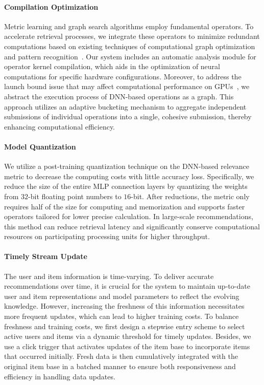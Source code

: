 \paragraph{Compilation Optimization}
Metric learning and graph search algorithms employ fundamental operators.
To accelerate retrieval processes, we integrate these operators to minimize redundant computations based on existing techniques of computational graph optimization and pattern recognition~\cite{niu2021dnnfusion}.
Our system includes an automatic analysis module for operator kernel compilation, which aids in the optimization of neural computations for specific hardware configurations.
Moreover, to address the launch bound issue that may affect computational performance on GPUs~\cite{wang2014characterization}, we abstract the execution process of DNN-based operations as a graph. This approach utilizes an adaptive bucketing mechanism to aggregate independent submissions of individual operations into a single, cohesive submission, thereby enhancing computational efficiency.

\paragraph{Model Quantization}
We utilize a post-training quantization technique on the DNN-based relevance metric to decrease the computing costs with little accuracy loss. Specifically, we reduce the size of the entire MLP connection layers by quantizing the weights from $32$-bit floating point numbers to $16$-bit. After reductions, the metric only requires half of the size for computing and memorization and supports faster operators tailored for lower precise calculation. In large-scale recommendations, this method can reduce retrieval latency and significantly conserve computational resources on participating processing units for higher throughput.

\paragraph{Timely Stream Update}
The user and item information is time-varying. To deliver accurate recommendations over time, it is crucial for the system to maintain up-to-date user and item representations and model parameters to reflect the evolving knowledge.
However, increasing the freshness of this information necessitates more frequent updates, which can lead to higher training costs.
To balance freshness and training costs, we first design a stepwise entry scheme to select active users and items via a dynamic threshold for timely updates.
Besides, we use a click trigger that activates updates of the item base to incorporate items that occurred initially.
Fresh data is then cumulatively integrated with the original item base in a batched manner to ensure both responsiveness and efficiency in handling data updates.


